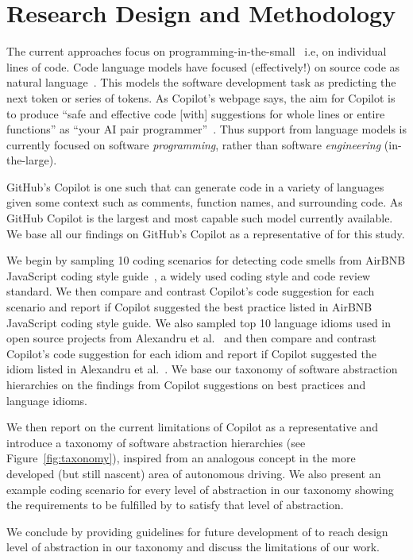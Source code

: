 \section{Research Design and Methodology}
The current \cct{} approaches focus on programming-in-the-small~\cite{DeRemer1976} i.e, on individual lines of code. 
Code language models have focused (effectively!) on source code as natural language~\cite{natural}.
This models the software development task as predicting the next token or series of tokens.
As Copilot's webpage says, the aim for Copilot is to produce ``safe and effective code [with] suggestions for whole lines or entire functions'' as ``your AI pair programmer''~\cite{Copilot-web}. 
Thus support from language models is currently focused on software \textit{programming}, rather than software \emph{engineering} (in-the-large).

GitHub's Copilot is one such \cct{} that can generate code in a variety of languages
given some context such as comments, function names, and surrounding code. As
GitHub Copilot is the largest and most capable such model currently available. We base all our findings on GitHub's Copilot as a representative of \cct{} for this study.

We begin by sampling 10 coding scenarios for detecting code smells from AirBNB JavaScript coding style guide~\cite{airbnb_code}, a widely used coding style and code review standard. We then compare and contrast Copilot's code suggestion for each scenario and report if Copilot suggested the best practice listed in AirBNB JavaScript coding style guide. 
We also sampled top 10 language idioms used in open source projects from Alexandru et al.~\cite{Alexandru2018} and then compare and contrast Copilot's code suggestion for each idiom and report if Copilot suggested the idiom listed in Alexandru et al.~\cite{Alexandru2018}. We base our taxonomy of software abstraction hierarchies on the findings from Copilot suggestions on best practices and language idioms.

We then report on the current limitations of Copilot as a representative \cct{} and introduce a taxonomy of software abstraction hierarchies (see Figure~\ref{fig:taxonomy}), inspired from an analogous concept in the more developed (but still nascent) area of autonomous driving. We also present an example coding scenario for every level of abstraction in our taxonomy showing the requirements to be fulfilled by \cct{} to satisfy that level of abstraction.

We conclude by providing guidelines for future development of \cct{} to reach design level of abstraction in our taxonomy and discuss the limitations of our work. 


